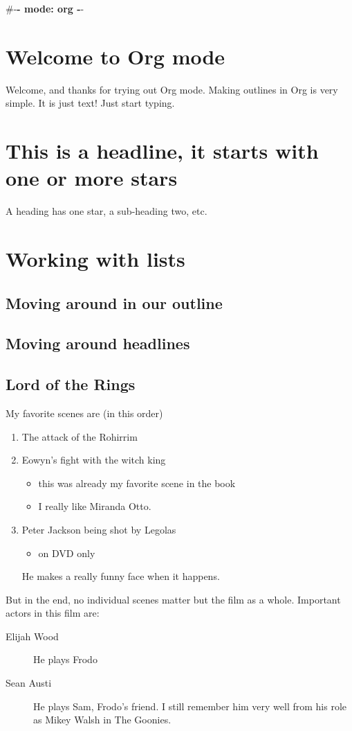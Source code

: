 \documentclass[11pt]{article}
\date{\today}
\title{}
\begin{document}
\tableofcontents

\#-\textbf{- mode: org -}-

\section{Welcome to Org mode}
\label{sec:orga5e3e6c}

Welcome, and thanks for trying out Org mode. Making outlines in
Org is very simple. It is just text! Just start typing.
\section{This is a headline, it starts with one or more stars}
\label{sec:org2790b52}
A heading has one star, a sub-heading two, etc.
\section{Working with lists}
\label{sec:org8e55439}
\subsection{Moving around in our outline}
\label{sec:orga3488a8}
\subsection{Moving around headlines}
\label{sec:orgf63be36}


\subsection{Lord of the Rings}
\label{sec:orgc463dd1}
My favorite scenes are (in this order)
\begin{enumerate}
\item The attack of the Rohirrim
\item Eowyn's fight with the witch king
\begin{itemize}
\item this was already my favorite scene in the book
\item I really like Miranda Otto.
\end{itemize}
\item Peter Jackson being shot by Legolas
\begin{itemize}
\item on DVD only
\end{itemize}
He makes a really funny face when it happens.
\end{enumerate}
But in the end, no individual scenes matter but the film as a whole.
Important actors in this film are:
\begin{description}
\item[{Elijah Wood}] He plays Frodo
\item[{Sean Austi}] He plays Sam, Frodo's friend.  I still remember
him very well from his role as Mikey Walsh in The Goonies.
\end{description}
\end{document}

